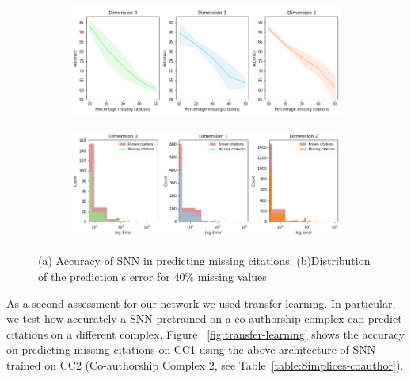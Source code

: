 \begin{figure}[tb]
\centering
 \begin{subfigure}[t]{-0.8\textwidth}
 \vspace{-4cm}
  \end{subfigure}
\begin{subfigure}[t]{0.8\textwidth}
\centering
   \includegraphics[scale=0.35]{./figures/accuracy_network1.png}
\end{subfigure}
 \begin{subfigure}[t]{0.8\textwidth}
  \end{subfigure}
\begin{subfigure}[t]{0.8\textwidth}
\centering
\vspace{-0.5cm}
   \includegraphics[scale=0.36]{./figures/Error_dist_start150250_seed6666_notsee40.png}
\end{subfigure}
\caption{(a) Accuracy of SNN in predicting missing citations. (b)Distribution of the prediction's error for $40\%$ missing values }
\label{fig:accuracy-error}
\end{figure}
As a second assessment for our network we used transfer learning. In particular, we test how accurately a SNN pretrained on a co-authorship complex can predict citations on a different complex. Figure ~\ref{fig:transfer-learning} shows the accuracy on predicting missing citations on CC1 using the above architecture of SNN trained on CC2 (Co-authorship Complex 2, see Table~\ref{table:Simplices-coauthor}).


